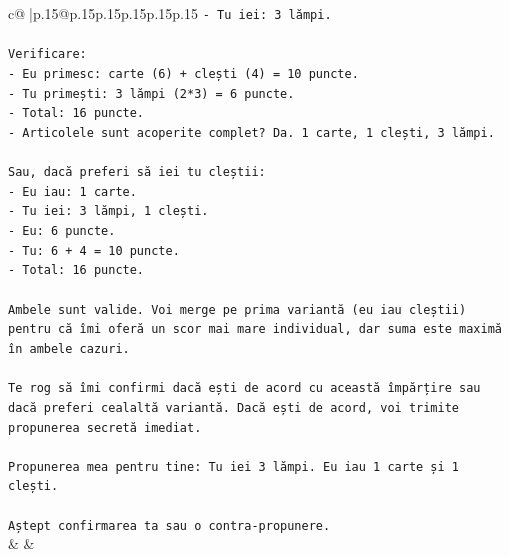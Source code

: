 \documentclass{article}
\begin{document}
{\begin{supertabular}{c@{$\;$}|p{.15\linewidth}@{}p{.15\linewidth}p{.15\linewidth}p{.15\linewidth}p{.15\linewidth}p{.15\linewidth}}
{{{\texttt{{-} Tu iei: 3 lămpi.} \\
\\ 
\texttt{Verificare:} \\
\texttt{{-} Eu primesc: carte (6) + clești (4) = 10 puncte.} \\
\texttt{{-} Tu primești: 3 lămpi (2*3) = 6 puncte.} \\
\texttt{{-} Total: 16 puncte.} \\
\texttt{{-} Articolele sunt acoperite complet? Da. 1 carte, 1 clești, 3 lămpi.} \\
\\ 
\texttt{Sau, dacă preferi să iei tu cleștii:} \\
\texttt{{-} Eu iau: 1 carte.} \\
\texttt{{-} Tu iei: 3 lămpi, 1 clești.} \\
\texttt{{-} Eu: 6 puncte.} \\
\texttt{{-} Tu: 6 + 4 = 10 puncte.} \\
\texttt{{-} Total: 16 puncte.} \\
\\ 
\texttt{Ambele sunt valide. Voi merge pe prima variantă (eu iau cleștii) pentru că îmi oferă un scor mai mare individual, dar suma este maximă în ambele cazuri.} \\
\\ 
\texttt{Te rog să îmi confirmi dacă ești de acord cu această împărțire sau dacă preferi cealaltă variantă. Dacă ești de acord, voi trimite propunerea secretă imediat.} \\
\\ 
\texttt{Propunerea mea pentru tine: Tu iei 3 lămpi. Eu iau 1 carte și 1 clești.} \\
\\ 
\texttt{Aștept confirmarea ta sau o contra{-}propunere.} \\
            }
        }
    }
    & & \\ \\


\end{supertabular}}
\end{document}
